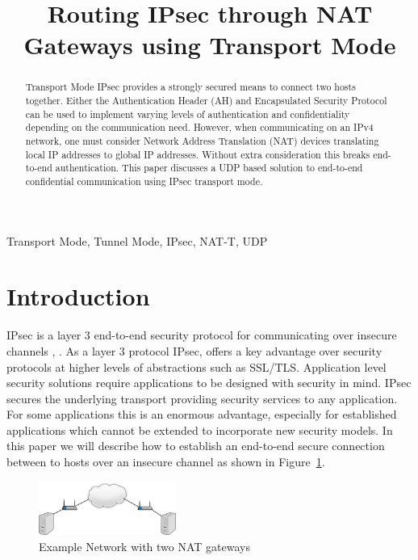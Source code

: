 \documentclass[conference,12pt]{IEEEtran}
\begin{document}
%
\title{Routing IPsec through NAT Gateways using Transport Mode}

\author{
}
\maketitle
\begin{abstract}
Transport Mode IPsec provides a strongly secured means to connect two hosts
together. Either the Authentication Header (AH) and Encapsulated Security
Protocol can be used to implement varying levels of authentication and
confidentiality depending on the communication need. However, when communicating
on an IPv4 network, one must consider Network Address Translation (NAT) devices
translating local IP addresses to global IP addresses. Without extra
consideration this breaks end-to-end authentication. This paper discusses 
a UDP based solution to end-to-end confidential communication using IPsec transport mode.
\end{abstract}

\begin{IEEEkeywords}
    Transport Mode, Tunnel Mode, IPsec, NAT-T, UDP
\end{IEEEkeywords}

\section{Introduction}
IPsec is a layer 3 end-to-end security protocol for communicating over insecure
channels \autocite{rfc4301}, \autocite{_osi_2014}. As a layer 3 protocol
IPsec, offers a key advantage over security protocols at higher levels of abstractions
such as SSL/TLS. Application level security solutions require applications to be
designed with security in mind. IPsec secures the underlying transport providing
security services to any application. For some applications this is an
enormous advantage, especially for established applications which cannot be
extended to incorporate new security models. In this paper we will describe 
how to establish an end-to-end secure connection between to hosts over an
insecure channel as shown in Figure~\ref{fig:network}.

\begin{figure}
\centering
\includegraphics[width=0.4\textwidth]{network.png}
\caption{Example Network with two NAT gateways}
\label{fig:network}
\end{figure}
\end{document}
